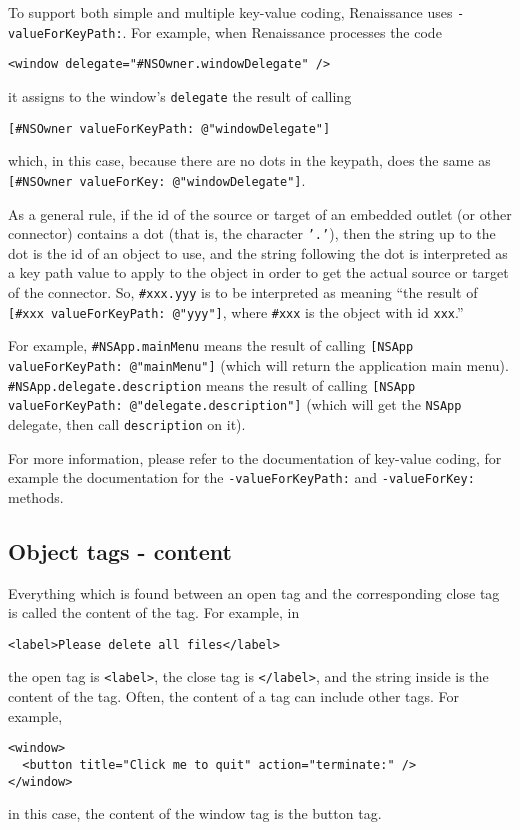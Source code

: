 To support both simple and multiple key-value coding, Renaissance uses
\texttt{-valueForKeyPath:}.  For example, when Renaissance processes the 
code
\begin{verbatim}
<window delegate="#NSOwner.windowDelegate" />
\end{verbatim}
it assigns to the window's \texttt{delegate} the result of calling
\begin{verbatim}
[#NSOwner valueForKeyPath: @"windowDelegate"]
\end{verbatim}
which, in this case, because there are no dots in the keypath, does
the same as \texttt{[\#NSOwner valueForKey: @"windowDelegate"]}.

As a general rule, if the id of the source or target of an embedded
outlet (or other connector) contains a dot (that is, the character
\texttt{'.'}), then the string up to the dot is the id of an object to
use, and the string following the dot is interpreted as a key path
value to apply to the object in order to get the actual source or
target of the connector.  So, \texttt{\#xxx.yyy} is to be interpreted
as meaning ``the result of \texttt{[\#xxx valueForKeyPath: @"yyy"]},
where \texttt{\#xxx} is the object with id \texttt{xxx}.''

For example, \texttt{\#NSApp.mainMenu} means the result of calling
\texttt{[NSApp valueForKeyPath: @"mainMenu"]} (which will return
the application main menu).  \texttt{\#NSApp.delegate.description}
means the result of calling \texttt{[NSApp valueForKeyPath:
@"delegate.description"]} (which will get the \texttt{NSApp} delegate,
then call \texttt{description} on it).

For more information, please refer to the documentation of key-value
coding, for example the documentation for the
\texttt{-valueForKeyPath:} and \texttt{-valueForKey:} methods.

\subsection{Object tags - content}
Everything which is found between an open tag and the corresponding
close tag is called the content of the tag.  For example, in
\begin{verbatim}
<label>Please delete all files</label>
\end{verbatim}
the open tag is \texttt{<label>}, the close tag is \texttt{</label>},
and the string inside is the content of the tag.  Often, the content
of a tag can include other tags.  For example,
\begin{verbatim}
<window>
  <button title="Click me to quit" action="terminate:" />
</window>
\end{verbatim}
in this case, the content of the window tag is the button tag.

